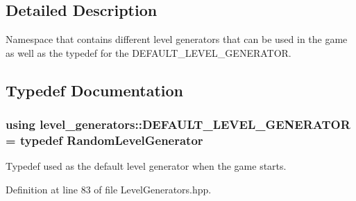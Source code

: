 \subsection{Detailed Description}
Namespace that contains different level generators that can be used in the game as well as the typedef for the D\+E\+F\+A\+U\+L\+T\+\_\+\+L\+E\+V\+E\+L\+\_\+\+G\+E\+N\+E\+R\+A\+T\+OR. 

\subsection{Typedef Documentation}
\subsubsection[{\texorpdfstring{D\+E\+F\+A\+U\+L\+T\+\_\+\+L\+E\+V\+E\+L\+\_\+\+G\+E\+N\+E\+R\+A\+T\+OR}{DEFAULT_LEVEL_GENERATOR}}]{\setlength{\rightskip}{0pt plus 5cm}using {\bf level\+\_\+generators\+::\+D\+E\+F\+A\+U\+L\+T\+\_\+\+L\+E\+V\+E\+L\+\_\+\+G\+E\+N\+E\+R\+A\+T\+OR} = typedef {\bf Random\+Level\+Generator}}\hypertarget{namespacelevel__generators_a22093c5a79dfcbc43107c23b5eee6375}{}\label{namespacelevel__generators_a22093c5a79dfcbc43107c23b5eee6375}


Typedef used as the default level generator when the game starts. 



Definition at line 83 of file Level\+Generators.\+hpp.

